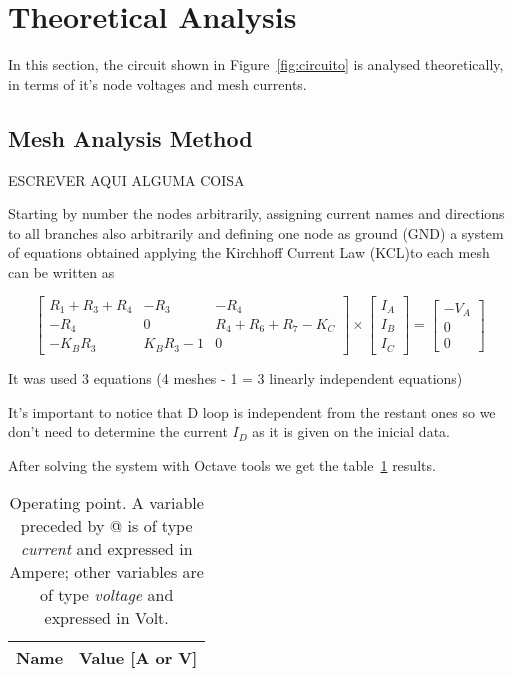 \section{Theoretical Analysis}
\label{sec:analysis}

In this section, the circuit shown in Figure~\ref{fig:circuito} is analysed
theoretically, in terms of it's node voltages and mesh currents.

\subsection{Mesh Analysis Method}

ESCREVER AQUI ALGUMA COISA

Starting by number the nodes arbitrarily, assigning current names and directions to all branches also arbitrarily and defining one node as ground (GND) a system of equations obtained applying the Kirchhoff Current Law (KCL)to each mesh can be written as 

\begin{equation}
\begin{bmatrix} 
R_1 + R_3 + R_4 & -R_3 & -R_4 \\ 
-R_4 & 0 & R_4 + R_6 + R_7 - K_C\\
-K_B R_3 & K_B R_3 - 1 & 0
\end{bmatrix} 
\times
\begin{bmatrix} 
I_A \\ 
I_B \\ 
I_C
\end{bmatrix} =
\begin{bmatrix} 
-V_A \\ 
0 \\ 
0
\end{bmatrix}
\end{equation}

It was used 3 equations (4 meshes - 1 = 3 linearly independent equations)

It's important to notice that D loop is independent from the restant ones so we don't need to determine the current $I_D$ as it is given on the inicial data.
  
After solving the system with Octave tools we get the table~\ref{tab:mesh} results.

\begin{table}[h]
  \centering
  \begin{tabular}{|l|r|}
    \hline    
    {\bf Name} & {\bf Value [A or V]} \\ \hline
    
  \end{tabular}
  \caption{Operating point. A variable preceded by @ is of type {\em current} and expressed in Ampere; other variables are of type {\it voltage} and expressed in Volt.}
  \label{tab:mesh}
\end{table}


